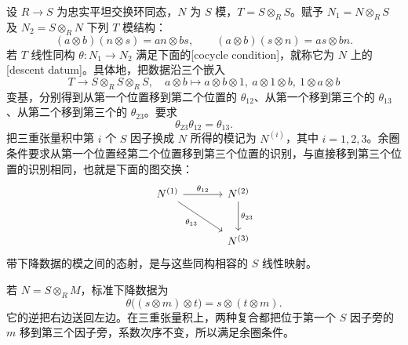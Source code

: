 \begin{definition}\label{b3:def:module-descent-datum}
	设 \(R\to S\) 为忠实平坦交换环同态，\(N\) 为 \(S\) 模，\(T=S\otimes_RS\)。赋予 \(N_1=N\otimes_RS\) 及 \(N_2=S\otimes_RN\) 下列 \(T\) 模结构：
	\[
		(a\otimes b)(n\otimes s)=an\otimes bs, \qquad (a\otimes b)(s\otimes n)=as\otimes bn.
	\]
	若 \(T\) 线性同构 \(\theta:N_1\to N_2\) 满足下面的[cocycle condition]，就称它为 \(N\) 上的[descent datum]。具体地，把数据沿三个嵌入
	\[
		T\longrightarrow S\otimes_RS\otimes_RS, \quad a\otimes b\longmapsto a\otimes b\otimes1,\ a\otimes1\otimes b,\ 1\otimes a\otimes b
	\]
	变基，分别得到从第一个位置移到第二个位置的 \(\theta_{12}\)、从第一个移到第三个的 \(\theta_{13}\)、从第二个移到第三个的 \(\theta_{23}\)。要求
	\[
		\theta_{23}\theta_{12}=\theta_{13}.
	\]
	把三重张量积中第 \(i\) 个 \(S\) 因子换成 \(N\) 所得的模记为 \(N^{(i)}\)，其中 \(i=1,2,3\)。余圈条件要求从第一个位置经第二个位置移到第三个位置的识别，与直接移到第三个位置的识别相同，也就是下面的图交换：
	\[
		\begin{tikzcd}[column sep=large,row sep=large]
			N^{(1)}\arrow[r,"\theta_{12}"]\arrow[dr,"\theta_{13}"'] &N^{(2)}\arrow[d,"\theta_{23}"]\\
			&N^{(3)}
		\end{tikzcd}
	\]
	带下降数据的模之间的态射，是与这些同构相容的 \(S\) 线性映射。
\end{definition}

若 \(N=S\otimes_RM\)，标准下降数据为
\[
	\theta\bigl((s\otimes m)\otimes t\bigr) =s\otimes(t\otimes m).
\]
它的逆把右边送回左边。在三重张量积上，两种复合都把位于第一个 \(S\) 因子旁的 \(m\) 移到第三个因子旁，系数次序不变，所以满足余圈条件。


